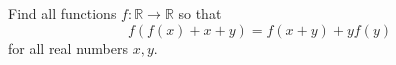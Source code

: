 Find all functions $f:\mathbb{R} \to \mathbb{R}$ so that
\[f(f(x)+x+y) = f(x+y) + y f(y)\]for all real numbers $x, y$.